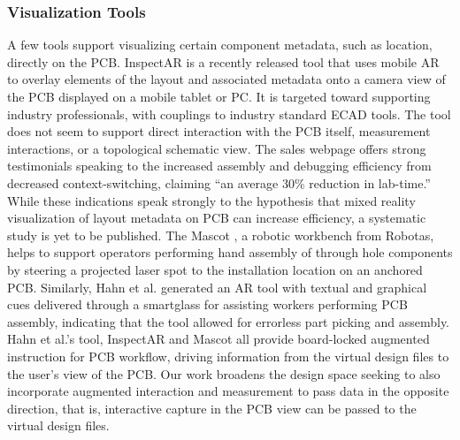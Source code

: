 \documentclass [11pt, proquest] {uwthesis}[2020/02/24]
\begin{document}
\subsubsection{Visualization Tools}
A few tools support visualizing certain component metadata, such as location, directly on the PCB.
InspectAR \cite{InspectARTools} is a recently released tool that uses mobile AR to overlay elements of the layout and associated metadata onto a camera view of the PCB displayed on a mobile tablet or PC.
It is targeted toward supporting industry professionals, with couplings to industry standard ECAD tools.
The tool does not seem to support direct interaction with the PCB itself, measurement interactions, or a topological schematic view.
The sales webpage offers strong testimonials speaking to the increased assembly and debugging efficiency from decreased context-switching, claiming “an average 30\% reduction in lab-time.”
While these indications speak strongly to the hypothesis that mixed reality visualization of layout metadata on PCB can increase efficiency, a systematic study is yet to be published.
The Mascot \cite{MascotRobotas}, a robotic workbench from Robotas, helps to support operators performing hand assembly of through hole components
by steering a projected laser spot to the installation location on an anchored PCB.
Similarly, Hahn et al. \cite{Hahn2015AugmentedProcess} generated an AR tool with textual and graphical cues delivered through a smartglass for assisting workers performing PCB assembly, indicating that the tool allowed for errorless part picking and assembly.
Hahn et al.’s tool, InspectAR and Mascot all provide board-locked augmented instruction for PCB workflow, driving information from the virtual design files to the user’s view of the PCB. Our work broadens the design space seeking to also incorporate augmented interaction and measurement to pass data in the opposite direction, that is, interactive capture in the PCB view can be passed to the virtual design files.

\end{document}
